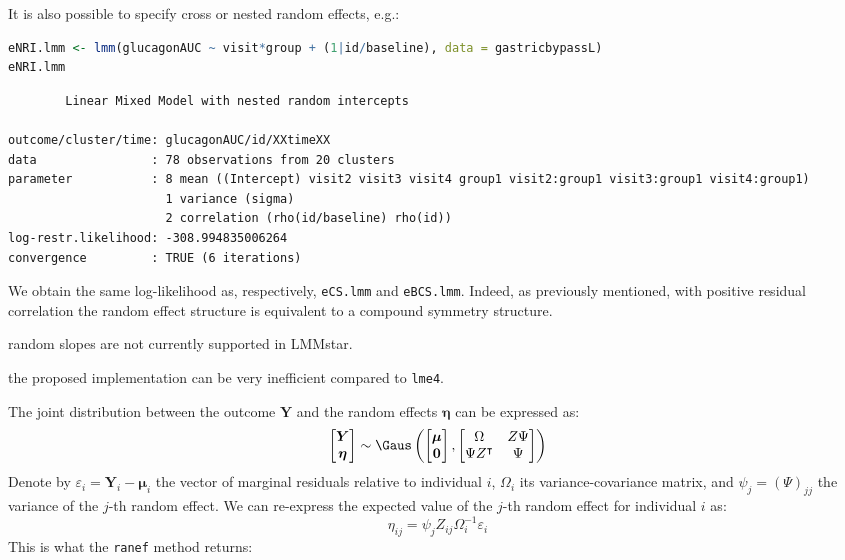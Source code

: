 \documentclass[12pt]{article}
\newcommand\Warning[1][3ex]{%
\renewcommand\stacktype{L}%
\scaleto{\stackon[1.3pt]{\color{red}$\triangle$}{\tiny\bfseries !}}{#1}%
\xspace
}
\newcommand\trans[1]{{#1}^\intercal}%
\newcommand\Veta{\boldsymbol{\eta}}
\newcommand{\VY}{\boldsymbol{Y}}
\begin{document}
It is also possible to specify cross or nested random effects, e.g.:
\begin{lstlisting}[language=r,numbers=none]
eNRI.lmm <- lmm(glucagonAUC ~ visit*group + (1|id/baseline), data = gastricbypassL)
eNRI.lmm
\end{lstlisting}

\label{}
\begin{verbatim}
		Linear Mixed Model with nested random intercepts 

outcome/cluster/time: glucagonAUC/id/XXtimeXX 
data                : 78 observations from 20 clusters 
parameter           : 8 mean ((Intercept) visit2 visit3 visit4 group1 visit2:group1 visit3:group1 visit4:group1) 
                      1 variance (sigma) 
                      2 correlation (rho(id/baseline) rho(id)) 
log-restr.likelihood: -308.994835006264 
convergence         : TRUE (6 iterations)
\end{verbatim}


We obtain the same log-likelihood as, respectively, \texttt{eCS.lmm} and
\texttt{eBCS.lmm}. Indeed, as previously mentioned, with positive residual
correlation the random effect structure is equivalent to a compound
symmetry structure. \newline \Warning random slopes are not currently
supported in LMMstar. \newline \Warning the proposed implementation can
be very inefficient compared to \texttt{lme4}.

\bigskip

The joint distribution between the outcome \(\VY\)
and the random effects \(\Veta\) can be expressed as:
\[
\begin{bmatrix} \VY \\ \Veta \end{bmatrix} \sim \Gaus\left(\begin{bmatrix} \boldsymbol{\mu} \\ \mathbf{0} \end{bmatrix}, \begin{bmatrix} \Omega & Z \Psi \\ \Psi \trans{Z} & \Psi \end{bmatrix}\right)
\]
Denote by \(\varepsilon_i=\VY_i-\boldsymbol{\mu}_i\) the vector of
marginal residuals relative to individual \(i\), \(\Omega_i\) its
variance-covariance matrix, and \(\psi_j=(\Psi)_{jj}\) the variance of the
\(j\)-th random effect. We can re-express the expected value of the
\(j\)-th random effect for individual \(i\) as:
\[ \eta_{ij} = \psi_{j} Z_{ij} \Omega_i^{-1}\varepsilon_i \]
This is what the \texttt{ranef} method returns:
\end{document}
